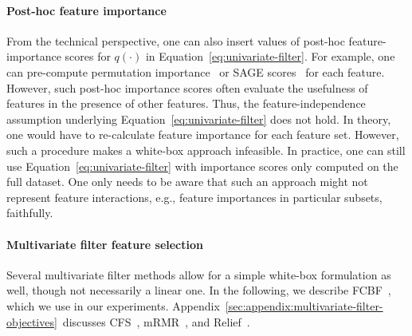 \documentclass{article}
\theoremstyle{definition}
\begin{document}
\paragraph{Post-hoc feature importance}

From the technical perspective, one can also insert values of post-hoc feature-importance scores for $q(\cdot)$ in Equation~\ref{eq:univariate-filter}.
For example, one can pre-compute permutation importance~\cite{breiman2001random} or SAGE scores~\cite{covert2020understanding} for each feature.
However, such post-hoc importance scores often evaluate the usefulness of features in the presence of other features.
Thus, the feature-independence assumption underlying Equation~\ref{eq:univariate-filter} does not hold.
In theory, one would have to re-calculate feature importance for each feature set.
However, such a procedure makes a white-box approach infeasible.
In practice, one can still use Equation~\ref{eq:univariate-filter} with importance scores only computed on the full dataset.
One only needs to be aware that such an approach might not represent feature interactions, e.g., feature importances in particular subsets, faithfully.

\paragraph{Multivariate filter feature selection}

Several multivariate filter methods allow for a simple white-box formulation as well, though not necessarily a linear one.
In the following, we describe FCBF~\cite{yu2003feature}, which we use in our experiments.
Appendix~\ref{sec:appendix:multivariate-filter-objectives}~discusses CFS~\cite{hall1999correlation}, mRMR~\cite{peng2005feature}, and Relief~\cite{kira1992feature}.
\end{document}
